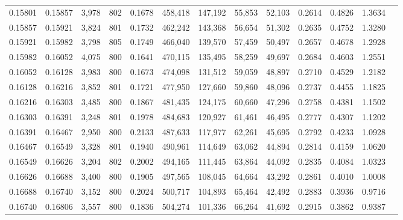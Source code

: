 \begin{tabular}{rrrrrrrrrrrrr}
0.15801 & 0.15857 &  3,978 & 802 &                                     0.1678 & 458,418 & 147,192 &  55,853 &  52,103 & 0.2614 & 0.4826 & 1.3634 \\
0.15857 & 0.15921 &  3,824 & 801 &                                     0.1732 & 462,242 & 143,368 &  56,654 &  51,302 & 0.2635 & 0.4752 & 1.3280 \\
0.15921 & 0.15982 &  3,798 & 805 &                                     0.1749 & 466,040 & 139,570 &  57,459 &  50,497 & 0.2657 & 0.4678 & 1.2928 \\
0.15982 & 0.16052 &  4,075 & 800 &                                     0.1641 & 470,115 & 135,495 &  58,259 &  49,697 & 0.2684 & 0.4603 & 1.2551 \\
0.16052 & 0.16128 &  3,983 & 800 &                                     0.1673 & 474,098 & 131,512 &  59,059 &  48,897 & 0.2710 & 0.4529 & 1.2182 \\
0.16128 & 0.16216 &  3,852 & 801 &                                     0.1721 & 477,950 & 127,660 &  59,860 &  48,096 & 0.2737 & 0.4455 & 1.1825 \\
0.16216 & 0.16303 &  3,485 & 800 &                                     0.1867 & 481,435 & 124,175 &  60,660 &  47,296 & 0.2758 & 0.4381 & 1.1502 \\
0.16303 & 0.16391 &  3,248 & 801 &                                     0.1978 & 484,683 & 120,927 &  61,461 &  46,495 & 0.2777 & 0.4307 & 1.1202 \\
0.16391 & 0.16467 &  2,950 & 800 &                                     0.2133 & 487,633 & 117,977 &  62,261 &  45,695 & 0.2792 & 0.4233 & 1.0928 \\
0.16467 & 0.16549 &  3,328 & 801 &                                     0.1940 & 490,961 & 114,649 &  63,062 &  44,894 & 0.2814 & 0.4159 & 1.0620 \\
0.16549 & 0.16626 &  3,204 & 802 &                                     0.2002 & 494,165 & 111,445 &  63,864 &  44,092 & 0.2835 & 0.4084 & 1.0323 \\
0.16626 & 0.16688 &  3,400 & 800 &                                     0.1905 & 497,565 & 108,045 &  64,664 &  43,292 & 0.2861 & 0.4010 & 1.0008 \\
0.16688 & 0.16740 &  3,152 & 800 &                                     0.2024 & 500,717 & 104,893 &  65,464 &  42,492 & 0.2883 & 0.3936 & 0.9716 \\
0.16740 & 0.16806 &  3,557 & 800 &                                     0.1836 & 504,274 & 101,336 &  66,264 &  41,692 & 0.2915 & 0.3862 & 0.9387 \\

\end{tabular}
